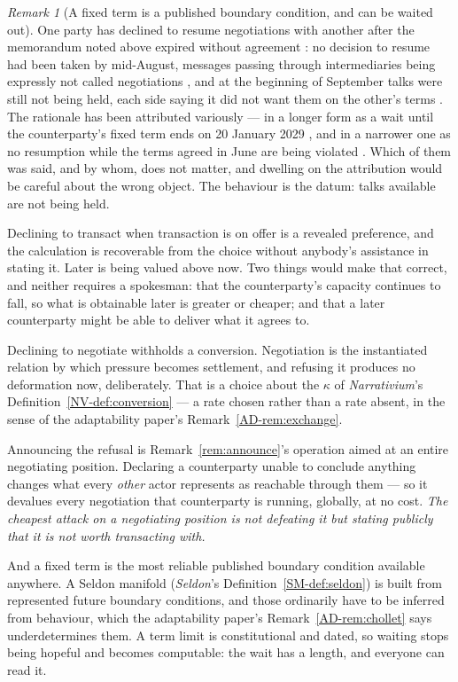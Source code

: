 \documentclass[11pt,a4paper]{article}
\theoremstyle{remark}
\newtheorem{remark}[definition]{Remark}
\begin{document}
\begin{remark}[A fixed term is a published boundary condition, and can be waited out]\label{rem:wait}
One party has declined to resume negotiations with another after the memorandum noted above expired
without agreement \citep{hormuz2026}: no decision to resume had been taken by mid-August, messages
passing through intermediaries being expressly not called negotiations \citep{talks2026}, and at the
beginning of September talks were still not being held, each side saying it did not want them on the
other's terms \citep{talks2026b}. The rationale has been attributed variously --- in a longer form as a
wait until the counterparty's fixed term ends on 20 January 2029 \citep{wait2029}, and in a narrower one
as no resumption while the terms agreed in June are being violated \citep{talks2026}. Which of them was
said, and by whom, does not matter, and dwelling on the attribution would be careful about the wrong
object. The behaviour is the datum: talks available are not being held.

Declining to transact when transaction is on offer is a revealed preference, and the calculation
is recoverable from the choice without anybody's assistance in stating it. Later is being valued above
now. Two things would make that correct, and neither requires a spokesman: that the counterparty's
capacity continues to fall, so what is obtainable later is greater or cheaper; and that a later
counterparty might be able to deliver what it agrees to.

Declining to negotiate withholds a conversion. Negotiation is the instantiated relation by which
pressure becomes settlement, and refusing it produces no deformation now, deliberately. That is a choice
about the $\kappa$ of \emph{Narrativium}'s Definition~\ref{NV-def:conversion} --- a rate chosen rather
than a rate absent, in the sense of the adaptability paper's Remark~\ref{AD-rem:exchange}.

Announcing the refusal is Remark~\ref{rem:announce}'s operation aimed at an entire negotiating
position. Declaring a counterparty unable to conclude anything changes what every \emph{other} actor
represents as reachable through them --- so it devalues every negotiation that counterparty is running,
globally, at no cost. \emph{The cheapest attack on a negotiating position is not defeating it but stating
publicly that it is not worth transacting with.}

And a fixed term is the most reliable published boundary condition available anywhere. A Seldon
manifold (\emph{Seldon}'s Definition~\ref{SM-def:seldon}) is built from represented future boundary
conditions, and those ordinarily have to be inferred
from behaviour, which the adaptability paper's Remark~\ref{AD-rem:chollet} says underdetermines them. A term limit is
constitutional and dated, so waiting stops being hopeful and becomes computable: the wait has a length,
and everyone can read it.


\end{remark}
\end{document}
